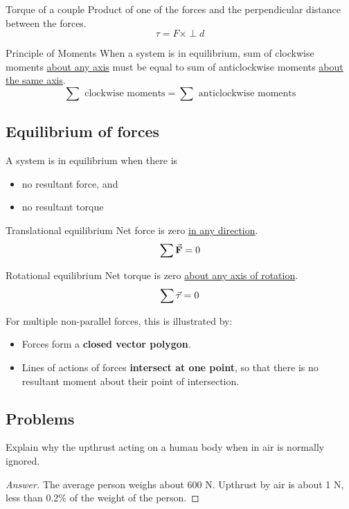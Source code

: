 \begin{defn}{Torque of a couple}{}
Product of one of the forces and the perpendicular distance between the forces.
\begin{equation} \tau = F \times \perp d \end{equation}
\end{defn}

\begin{defn}{Principle of Moments}{}
When a system is in equilibrium, sum of clockwise moments \underline{about any axis} must be equal to sum of anticlockwise moments \underline{about the same axis}.
\begin{equation} \sum \text{ clockwise moments} = \sum \text{ anticlockwise moments} \end{equation}
\end{defn} 
\pagebreak

\subsection{Equilibrium of forces}
A system is in equilibrium when there is 
\begin{itemize}
\item no resultant force, and
\item no resultant torque
\end{itemize}

\begin{defn}{Translational equilibrium}{}
Net force is zero \underline{in any direction}.
\[ \sum \va{F} = 0 \]
\end{defn} 

\begin{defn}{Rotational equilibrium}{}
Net torque is zero \underline{about any axis of rotation}. 
\[ \sum \va{\tau} = 0 \]
\end{defn}

For multiple non-parallel forces, this is illustrated by: 
\begin{itemize}
\item Forces form a \textbf{closed vector polygon}.
\item Lines of actions of forces \textbf{intersect at one point}, so that there is no resultant moment about their point of intersection.
\end{itemize}
\pagebreak

\subsection{Problems}
\begin{prbm}
Explain why the upthrust acting on a human body when in air is normally ignored.
\end{prbm}
\begin{proof}[Answer]
The average person weighs about 600 \unit{N}. Upthrust by air is about 1 \unit{N}, less than 0.2\% of the weight of the person.
\end{proof}

